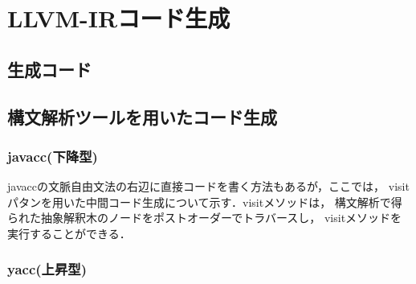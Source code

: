 \documentclass[dvipdfmx,a4j]{jbook}
\begin{document}
\appendix
\chapter{LLVM-IRコード生成}
\section{生成コード}
\section{構文解析ツールを用いたコード生成}
\subsection{javacc(下降型)}

javaccの文脈自由文法の右辺に直接コードを書く方法もあるが，ここでは，
visitパタンを用いた中間コード生成について示す．visitメソッドは，
構文解析で得られた抽象解釈木のノードをポストオーダーでトラバースし，
visitメソッドを実行することができる．

\subsection{yacc(上昇型)}
\end{document}
